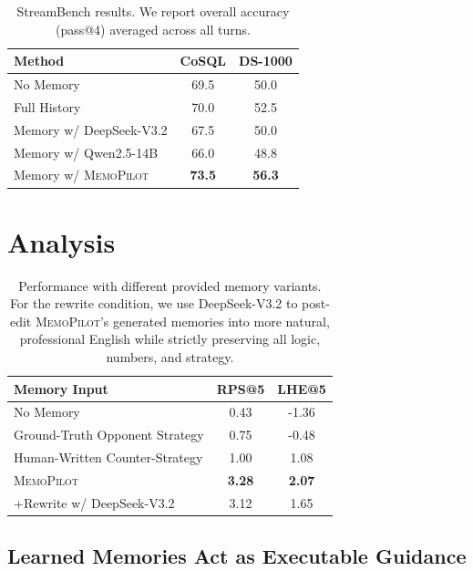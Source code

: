 \documentclass{article}
\newcommand{\methodname}{MemoPilot}
\newcommand{\method}{\textsc{\methodname}}
\theoremstyle{plain}
\theoremstyle{definition}
\theoremstyle{remark}
\begin{document}
\begin{table}[t]
\centering
\caption{StreamBench results. We report overall accuracy (pass@4) averaged across all turns. }
\label{tab:streambench}
\small
\begin{tabular}{@{}lcc@{}}
\toprule
\textbf{Method} & \textbf{CoSQL} & \textbf{DS-1000} \\
\midrule
No Memory & 69.5 & 50.0 \\
Full History & 70.0 & 52.5 \\
Memory w/ DeepSeek-V3.2  & 67.5 & 50.0 \\
Memory w/ Qwen2.5-14B & 66.0 & 48.8 \\
Memory w/ \method{} & \textbf{73.5} & \textbf{56.3} \\
\bottomrule
\end{tabular}
\end{table}

\section{Analysis}

\begin{table}[t]
\centering
\caption{Performance with different provided memory variants. For the rewrite condition, we use DeepSeek-V3.2 to post-edit \method{}'s generated memories into more natural, professional English while strictly preserving all logic, numbers, and strategy.}
\label{tab:guidance}
\small
\begin{tabular}{lcc}
\toprule
\textbf{Memory Input} & \textbf{RPS@5} & \textbf{LHE@5} \\
\midrule
No Memory & 0.43 & -1.36 \\
Ground-Truth Opponent Strategy & 0.75 & -0.48 \\
Human-Written Counter-Strategy & 1.00 & 1.08 \\
\method{} & \textbf{3.28} & \textbf{2.07} \\
 \quad +Rewrite w/ DeepSeek-V3.2 & 3.12 & 1.65\\

\bottomrule
\end{tabular}
\end{table}

\subsection{Learned Memories Act as Executable Guidance}
\label{sec:analysis}
\end{document}
